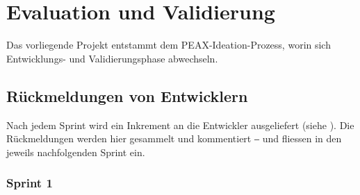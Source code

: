 \section{Evaluation und Validierung}

Das vorliegende Projekt entstammt dem PEAX-Ideation-Prozess, worin sich Entwicklungs- und Validierungsphase abwechseln. 

\subsection{Rückmeldungen von Entwicklern}

Nach jedem Sprint wird ein Inkrement an die Entwickler ausgeliefert (siehe ). Die Rückmeldungen werden hier gesammelt und kommentiert ‒ und fliessen in den jeweils nachfolgenden Sprint ein.

\subsubsection{Sprint 1}
\label{sec:feedback-sprint1}

